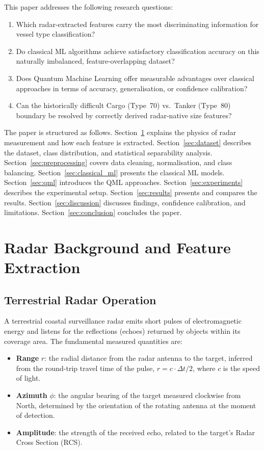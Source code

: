 \documentclass[12pt, a4paper]{article}
\begin{document}
This paper addresses the following research questions:
\begin{enumerate}[label=\textbf{RQ\arabic*.}]
    \item Which radar-extracted features carry the most discriminating information
          for vessel type classification?
    \item Do classical ML algorithms achieve satisfactory classification accuracy
          on this naturally imbalanced, feature-overlapping dataset?
    \item Does Quantum Machine Learning offer measurable advantages over classical
          approaches in terms of accuracy, generalisation, or confidence calibration?
    \item Can the historically difficult Cargo (Type~70) vs.\ Tanker (Type~80)
          boundary be resolved by correctly derived radar-native size features?
\end{enumerate}

The paper is structured as follows.
Section~\ref{sec:radar_background} explains the physics of radar measurement and
how each feature is extracted.
Section~\ref{sec:dataset} describes the dataset, class distribution, and
statistical separability analysis.
Section~\ref{sec:preprocessing} covers data cleaning, normalisation, and class
balancing.
Section~\ref{sec:classical_ml} presents the classical ML models.
Section~\ref{sec:qml} introduces the QML approaches.
Section~\ref{sec:experiments} describes the experimental setup.
Section~\ref{sec:results} presents and compares the results.
Section~\ref{sec:discussion} discusses findings, confidence calibration, and
limitations.
Section~\ref{sec:conclusion} concludes the paper.

\section{Radar Background and Feature Extraction}
\label{sec:radar_background}

\subsection{Terrestrial Radar Operation}

A terrestrial coastal surveillance radar emits short pulses of electromagnetic
energy and listens for the reflections (echoes) returned by objects within its
coverage area. The fundamental measured quantities are:
\begin{itemize}
    \item \textbf{Range} $r$: the radial distance from the radar antenna to the
          target, inferred from the round-trip travel time of the pulse,
          $r = c \cdot \Delta t / 2$, where $c$ is the speed of light.
    \item \textbf{Azimuth} $\phi$: the angular bearing of the target measured
          clockwise from North, determined by the orientation of the rotating
          antenna at the moment of detection.
    \item \textbf{Amplitude}: the strength of the received echo, related to the
          target's Radar Cross Section (RCS).
\end{itemize}
\end{document}
